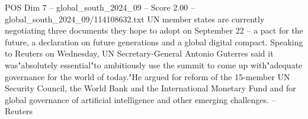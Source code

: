 \begin{textsample}{POS Dim 7 – global\_south\_2024\_09 – Score 2.00 – global\_south\_2024\_09/114108632.txt}
UN member states are currently negotiating three documents they hope to adopt on September 22 -- a pact for the future, a declaration on future generations and a global digital compact.
Speaking to Reuters on Wednesday, UN Secretary-General Antonio Guterres said it was"absolutely essential"to ambitiously use the summit to come up with"adequate governance for the world of today."He argued for reform of the 15-member UN Security Council, the World Bank and the International Monetary Fund and for global governance of artificial intelligence and other emerging challenges. -- Reuters

\end{textsample}
